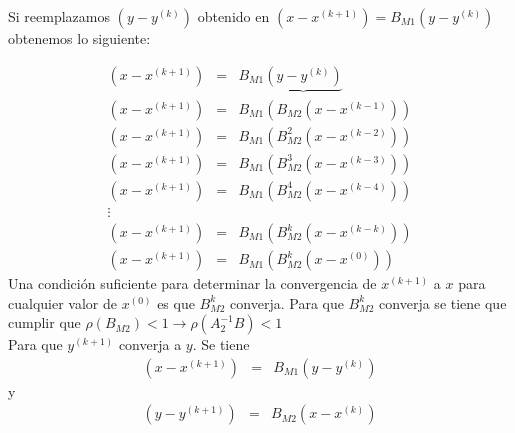 \begin{itemize}
    Si reemplazamos $(y - y^{(k)})$ obtenido en $ (x - x^{(k + 1)}) = B_{M1}(y - y^{(k)})$ obtenemos lo siguiente:
    
    \begin{eqnarray*}
        (x - x^{(k + 1)}) & = &  B_{M1}\underbrace{(y - y^{(k)})}\\
        (x - x^{(k + 1)}) & = &  B_{M1}(B_{M2}(x - x^{(k - 1)}))\\
        (x - x^{(k + 1)}) & = &  B_{M1}(B_{M2}^{2}(x - x^{(k - 2)}))\\
        (x - x^{(k + 1)}) & = &  B_{M1}(B_{M2}^{3}(x - x^{(k - 3)}))\\
        (x - x^{(k + 1)}) & = &  B_{M1}(B_{M2}^{4}(x - x^{(k - 4)}))\\
        \vdots \\
        (x - x^{(k + 1)}) & = &  B_{M1}(B_{M2}^{k}(x - x^{(k - k)}))\\
        (x - x^{(k + 1)}) & = &  B_{M1}(B_{M2}^{k}(x - x^{(0)}))
    \end{eqnarray*}
    Una condición suficiente para determinar la convergencia de $x^{(k + 1)}$ a $x$ para cualquier valor de $x^{(0)}$ es que $B_{M2}^{k}$ converja. Para que $B_{M2}^{k}$ converja se tiene que cumplir que  $\rho (B_{M2}) < 1  \rightarrow  \rho (A_{2}^{-1}B) < 1$ \\
    
    Para que $y^{(k + 1)}$ converja a $y$. Se tiene 
    \begin{eqnarray*}
        (x - x^{(k + 1)}) & = &  B_{M1}(y - y^{(k)})
    \end{eqnarray*} 
    y
    \begin{eqnarray*}
        (y - y^{(k + 1)}) & = &  B_{M2}(x - x^{(k)})
    \end{eqnarray*} 
    

\end{itemize}
